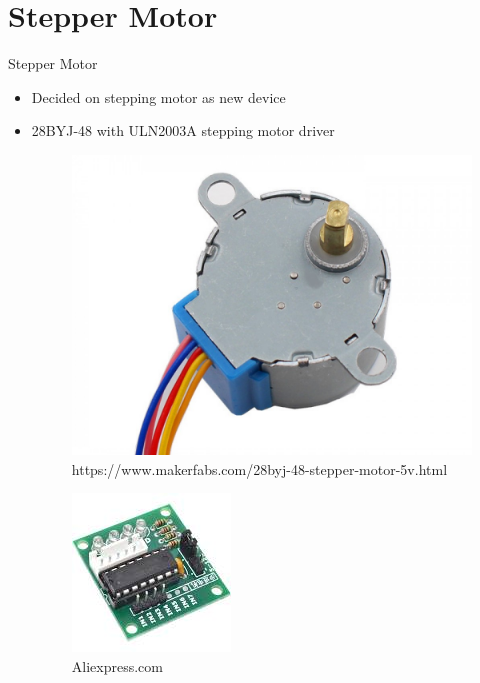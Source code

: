 \documentclass{beamer}
\begin{document}
\section{Stepper Motor}
\begin{frame}{Stepper Motor}
\begin{itemize}
\item Decided on stepping motor as new device
\item 28BYJ-48 with ULN2003A stepping motor driver
\begin{figure}
\includegraphics[scale=0.08]{../figs/28byj48stepper}
\caption{https://www.makerfabs.com/28byj-48-stepper-motor-5v.html}
\end{figure}

\begin{figure}
\includegraphics[scale=0.4]{../figs/uln2003astepper}
\caption{Aliexpress.com}
\end{figure}
\end{itemize}
\end{frame}
\end{document}
